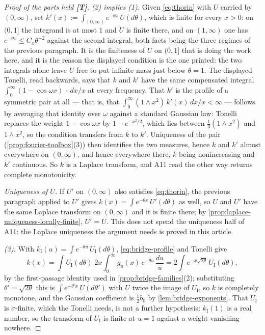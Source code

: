 \begin{proof}[Proof of the parts held \textbf{[T]}]
\emph{(2) implies (1).} Given \ref{eq:thorin} with $U$ carried by $(0,\infty)$, set
$k'(x) := \int_{(0,\infty)} e^{-\theta x}\,U(d\theta)$, which is finite for every $x > 0$: on
$(0,1]$ the integrand is at most $1$ and $U$ is finite there, and on $(1,\infty)$ one has
$e^{-\theta x} \le C_x\theta^{-2}$ against the second integral, both facts being the three
regimes of the previous paragraph. It is the finiteness of $U$ on $(0,1]$ that is doing the work
here, and it is the reason the displayed condition is the one printed: the two integrals alone
leave $U$ free to put infinite mass just below $\theta = 1$. The displayed Tonelli, read
backwards, says that $k$ and $k'$ have the same
compensated integral $\int_0^\infty(1-\cos\omega x)\,\cdot\,dx/x$ at every frequency. That $k'$
is the profile of a symmetric \Levy{} pair at all --- that is, that
$\int_0^\infty (1\wedge x^2)\,k'(x)\,dx/x < \infty$ --- follows by averaging that identity over
$\omega$ against a standard Gaussian law: Tonelli replaces the weight $1 - \cos\omega x$ by
$1 - e^{-x^2/2}$, which lies between $\tfrac13(1 \wedge x^2)$ and $1 \wedge x^2$, so the \Levy{}
condition transfers from $k$ to $k'$. Uniqueness of the pair (\ref{prop:fourier-toolbox}(3)) then
identifies the two \Levy{} measures, hence $k$ and $k'$ almost everywhere on $(0,\infty)$, and hence
everywhere there, $k$ being nonincreasing and $k'$ continuous. So $k$ is a Laplace transform, and
A11 read the other way returns complete monotonicity.

\emph{Uniqueness of $U$.} If $U'$ on $(0,\infty)$ also satisfies \ref{eq:thorin}, the previous
paragraph applied to $U'$ gives $k(x) = \int e^{-\theta x}\,U'(d\theta)$ as well, so $U$ and $U'$
have the same Laplace transform on $(0,\infty)$ and it is finite there; by
\ref{prop:laplace-uniqueness-locally-finite}, $U' = U$. This does not spend the uniqueness half
of A11: the Laplace uniqueness the argument needs is proved in this article.

\emph{(3).} With $k_{\mathrm I}(u) = \int e^{-\theta u}\,U_{\mathrm I}(d\theta)$,
\ref{eq:bridge-profile} and Tonelli give
\[
  k(x) = \int U_{\mathrm I}(d\theta)\;2x\int_0^\infty g_u(x)\,e^{-\theta u}\,\frac{du}{u}
       = 2\int e^{-x\sqrt{2\theta}}\,U_{\mathrm I}(d\theta),
\]
by the first-passage identity used in \ref{prop:bridge-families}(2); substituting
$\theta' = \sqrt{2\theta}$ this is $\int e^{-\theta'x}\,U(d\theta')$ with $U$ twice the image
of $U_{\mathrm I}$, so $k$ is completely monotone, and the Gaussian coefficient is
$\tfrac12 b_0$ by \ref{lem:bridge-exponents}. That $U_{\mathrm I}$ is $\sigma$-finite, which the
Tonelli needs, is not a further hypothesis: $k_{\mathrm I}(1)$ is a real number, so the
transform of $U_{\mathrm I}$ is finite at $u = 1$ against a weight vanishing nowhere.


\end{proof}
